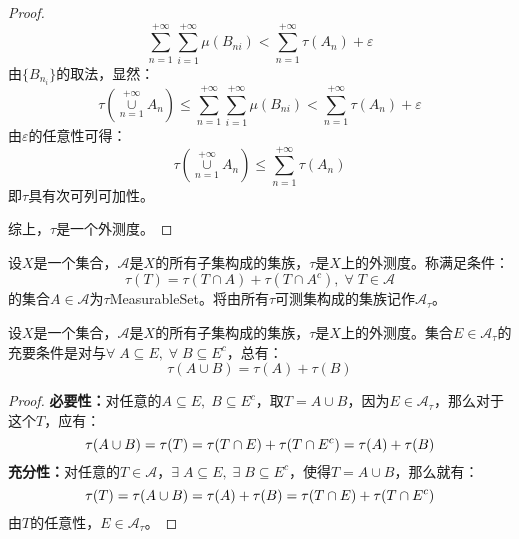 \begin{proof}
\begin{equation*}
		\sum_{n=1}^{+\infty}\sum_{i=1}^{+\infty}\mu(B_{ni})<\sum_{n=1}^{+\infty}\tau(A_n)+\varepsilon
	\end{equation*}
	由$\{B_{n_i}\}$的取法，显然：
	\begin{equation*}
		\tau\left(\underset{n=1}{\overset{+\infty}{\cup}}A_n\right)\leqslant\sum_{n=1}^{+\infty}\sum_{i=1}^{+\infty}\mu(B_{ni})<\sum_{n=1}^{+\infty}\tau(A_n)+\varepsilon
	\end{equation*}
	由$\varepsilon$的任意性可得：
	\begin{equation*}
		\tau\left(\underset{n=1}{\overset{+\infty}{\cup}}A_n\right)\leqslant\sum_{n=1}^{+\infty}\tau(A_n)
	\end{equation*}
	即$\tau$具有次可列可加性。\par
	综上，$\tau$是一个外测度。
\end{proof}
\begin{definition}
	设$X$是一个集合，$\mathscr{A}$是$X$的所有子集构成的集族，$\tau$是$X$上的外测度。称满足条件：
	\begin{equation*}
		\tau(T)=\tau(T\cap A)+\tau(T\cap A^c),\;\forall\;T\in\mathscr{A}
	\end{equation*}
	的集合$A\in\mathscr{A}$为$\tau$\gls{MeasurableSet}。将由所有$\tau$可测集构成的集族记作$\mathscr{A}_{\tau}$。
\end{definition}
\begin{lemma}\label{lem:EmeasureAB}
	设$X$是一个集合，$\mathscr{A}$是$X$的所有子集构成的集族，$\tau$是$X$上的外测度。集合$E\in\mathscr{A}_{\tau}$的充要条件是对与$\forall\;A\subseteq E,\;\forall\;B\subseteq E^c$，总有：
	\begin{equation*}
		\tau(A\cup B)=\tau(A)+\tau(B)
	\end{equation*}
\end{lemma}
\begin{proof}
	\textbf{必要性：}对任意的$A\subseteq E,\;B\subseteq E^c$，取$T=A\cup B$，因为$E\in \mathscr{A}_{\tau}$，那么对于这个$T$，应有：
	\begin{equation}
		\tau(A\cup B)=\tau(T)=\tau(T\cap E)+\tau(T\cap E^c)=\tau(A)+\tau(B)\notag
	\end{equation}
	\textbf{充分性：}对任意的$T\in \mathscr{A}$，$\exists\;A\subseteq E,\;\exists\; B\subseteq E^c$，使得$T=A\cup B$，那么就有：
	\begin{equation}
		\tau(T)=\tau(A\cup B)=\tau(A)+\tau(B)=\tau(T\cap E)+\tau(T\cap E^c)\notag
	\end{equation}
	由$T$的任意性，$E\in \mathscr{A}_{\tau}$。
\end{proof}
